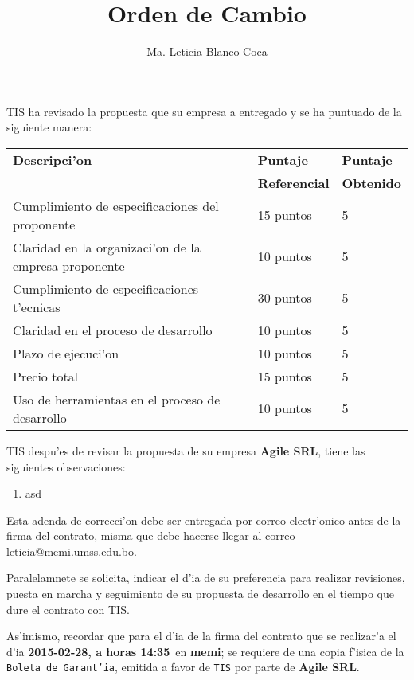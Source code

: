 \documentclass[10pt,letterpaper,twoside]{article}
\newcommand{\empresa}[0]{\textbf{Agile SRL}}
\newcommand{\diayhora}[0]{\textbf{2015-02-28, a horas 14:35}}
\newcommand{\lugar}[0]{\textbf{memi}}
\newcommand{\pp}[0]{5}
\newcommand{\sep}[0]{5}
\newcommand{\tp}[0]{5}
\newcommand{\cp}[0]{5}
\newcommand{\qp}[0]{5}
\newcommand{\ssp}[0]{5}
\newcommand{\sssp}[0]{5}
\newcommand{\observacionesDetalle}[1]{\item #1}
\newcommand{\observaciones}[0]{\observacionesDetalle{asd}}
\begin{document}
\title{Orden de Cambio}
\author{Ma. Leticia Blanco Coca}
\maketitle


TIS ha revisado la propuesta que su empresa a entregado y se ha puntuado de la siguiente manera:

\begin{tabular}{|l|l|l|}
\hline \textbf{Descripci'on}& \textbf{Puntaje}&\textbf{Puntaje} \\
& \textbf{Referencial}&\textbf{Obtenido} \\
\hline Cumplimiento de especificaciones del proponente       & 15 puntos & \pp \\
\hline Claridad en la organizaci'on de la empresa proponente & 10 puntos & \sep \\
\hline Cumplimiento de especificaciones t'ecnicas            & 30 puntos & \tp \\ 
\hline Claridad en el proceso de desarrollo                  & 10 puntos & \cp \\
\hline Plazo de ejecuci'on                                   & 10 puntos & \qp \\
\hline Precio total                                          & 15 puntos & \ssp \\
\hline Uso de herramientas en el proceso de desarrollo       & 10 puntos & \sssp \\
\hline
\end{tabular}

TIS despu'es de revisar la propuesta de su empresa \empresa, tiene las siguientes observaciones:

\begin{enumerate}
\observaciones
\end{enumerate}

Esta adenda de correcci'on debe ser entregada por correo electr'onico antes de la firma del contrato, misma que debe hacerse llegar al correo leticia@memi.umss.edu.bo.


Paralelamnete se solicita, indicar el d'ia de su preferencia para realizar revisiones, puesta
en marcha  y 
seguimiento de su propuesta de desarrollo en el tiempo que dure el contrato con TIS.


As'imismo, recordar que para el d'ia de la firma del contrato que se realizar'a el d'ia \diayhora\ en \lugar; se requiere de una copia f'isica
 de la 
\texttt{Boleta de Garant'ia}, emitida a favor de \texttt{TIS} por parte de \empresa.
\end{document}
